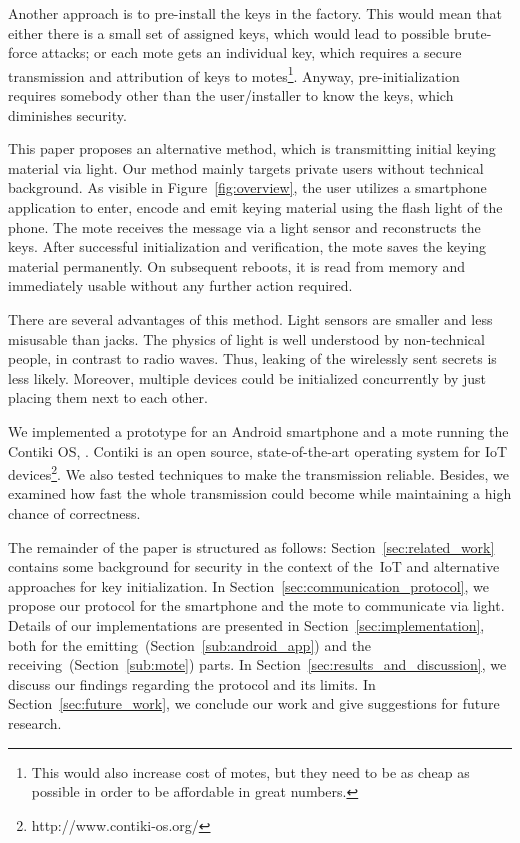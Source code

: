 \documentclass{sig-alternate} %
\begin{document}
Another approach is to pre-install the keys in the factory.
This would mean that either there is a small set of assigned keys, which would lead to possible brute-force attacks; or each mote gets an individual key, which requires a secure transmission and attribution of keys to motes\footnote{This would also increase cost of motes, but they need to be as cheap as possible in order to be affordable in great numbers.}.
Anyway, pre-initialization requires somebody other than the user/installer to know the keys, which diminishes security.

This paper proposes an alternative method, which is transmitting initial keying material via light.
Our method mainly targets private users without technical background.
As visible in Figure~\ref{fig:overview}, the user utilizes a smartphone application to enter, encode and emit keying material using the flash light of the phone.
The mote receives the message via a light sensor and reconstructs the keys.
After successful initialization and verification, the mote saves the keying material permanently.
On subsequent reboots, it is read from memory and immediately usable without any further action required.

There are several advantages of this method.
Light sensors are smaller and less misusable than jacks.
The physics of light is well understood by non-technical people, in contrast to radio waves.
Thus, leaking of the wirelessly sent secrets is less likely.
Moreover, multiple devices could be initialized concurrently by just placing them next to each other.

We implemented a prototype for an Android smartphone and a mote running the Contiki OS, \cite{dunkels04contiki}.
Contiki is an open source, state-of-the-art operating system for IoT devices\footnote{http://www.contiki-os.org/}.
We also tested techniques to make the transmission reliable.
Besides, we examined how fast the whole transmission could become while maintaining a high chance of correctness.

The remainder of the paper is structured as follows:
Section~\ref{sec:related_work} contains some background for security in the context of the~IoT and alternative approaches for key initialization.
In Section~\ref{sec:communication_protocol}, we propose our protocol for the smartphone and the mote to communicate via light.
Details of our implementations are presented in Section~\ref{sec:implementation}, both for the emitting~(Section~\ref{sub:android_app}) and the receiving~(Section~\ref{sub:mote}) parts.
In Section~\ref{sec:results_and_discussion}, we discuss our findings regarding the protocol and its limits.
In Section~\ref{sec:future_work}, we conclude our work and give suggestions for future research.
\end{document}
